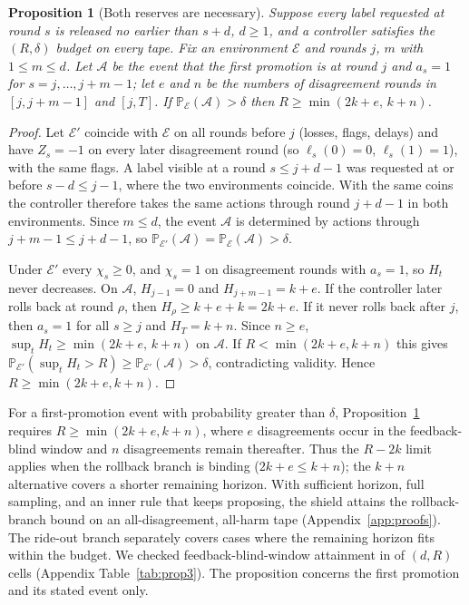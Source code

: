 \documentclass[10pt]{article}
\theoremstyle{plain}
\newtheorem{proposition}{Proposition}
\theoremstyle{definition}
\newcommand{\PP}{\mathbb{P}}
\begin{document}
\begin{proposition}[Both reserves are necessary]\label{prop:reserves}
Suppose every label requested at round $s$ is released no earlier than $s+d$, $d\ge1$, and a controller satisfies the $(R,\delta)$ budget on every tape. Fix an environment $\mathcal E$ and rounds $j$, $m$ with $1\le m\le d$. Let $\mathcal A$ be the event that the first promotion is at round $j$ and $a_s=1$ for $s=j,\dots,j+m-1$; let $e$ and $n$ be the numbers of disagreement rounds in $[j,j+m-1]$ and $[j,T]$. If $\PP_{\mathcal E}(\mathcal A)>\delta$ then $R\ge\min(2k+e,\,k+n)$.
\end{proposition}
\begin{proof}
Let $\mathcal E'$ coincide with $\mathcal E$ on all rounds before $j$ (losses, flags, delays) and have $Z_s=-1$ on every later disagreement round (so $\ell_s(0)=0$, $\ell_s(1)=1$), with the same flags. A label visible at a round $s\le j+d-1$ was requested at or before $s-d\le j-1$, where the two environments coincide. With the same coins the controller therefore takes the same actions through round $j+d-1$ in both environments. Since $m\le d$, the event $\mathcal A$ is determined by actions through $j+m-1\le j+d-1$, so $\PP_{\mathcal E'}(\mathcal A)=\PP_{\mathcal E}(\mathcal A)>\delta$.

Under $\mathcal E'$ every $\chi_s\ge0$, and $\chi_s=1$ on disagreement rounds with $a_s=1$, so $H_t$ never decreases. On $\mathcal A$, $H_{j-1}=0$ and $H_{j+m-1}=k+e$. If the controller later rolls back at round $\rho$, then $H_\rho\ge k+e+k=2k+e$. If it never rolls back after $j$, then $a_s=1$ for all $s\ge j$ and $H_T=k+n$. Since $n\ge e$, $\sup_tH_t\ge\min(2k+e,\,k+n)$ on $\mathcal A$. If $R<\min(2k+e,k+n)$ this gives $\PP_{\mathcal E'}(\sup_tH_t>R)\ge\PP_{\mathcal E'}(\mathcal A)>\delta$, contradicting validity. Hence $R\ge\min(2k+e,k+n)$.
\end{proof}

For a first-promotion event with probability greater than $\delta$, Proposition~\ref{prop:reserves} requires $R\ge\min(2k+e,k+n)$, where $e$ disagreements occur in the feedback-blind window and $n$ disagreements remain thereafter. Thus the $R-2k$ limit applies when the rollback branch is binding ($2k+e\le k+n$); the $k+n$ alternative covers a shorter remaining horizon. With sufficient horizon, full sampling, and an inner rule that keeps proposing, the shield attains the rollback-branch bound on an all-disagreement, all-harm tape (Appendix~\ref{app:proofs}). The ride-out branch separately covers cases where the remaining horizon fits within the budget. We checked feedback-blind-window attainment in \PThreeAttain{} of \PThreeCells{} $(d,R)$ cells (Appendix Table~\ref{tab:prop3}). The proposition concerns the first promotion and its stated event only.
\end{document}
